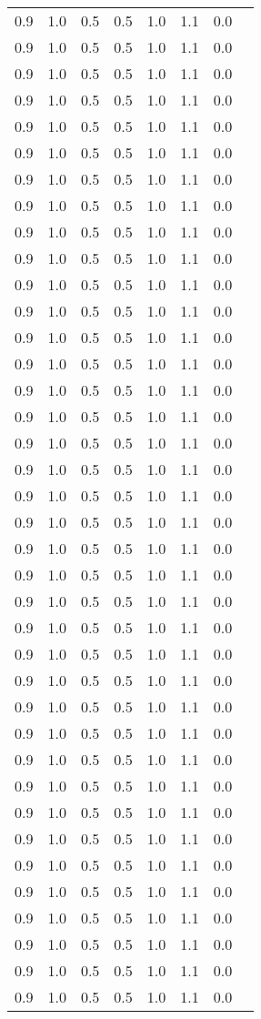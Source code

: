 \begin{tabular}{L{1in}|L{1in}|L{1in}|L{1in}|L{1in}|L{1in}|L{1in}|L{1in}}
0.9&1.0&0.5&0.5&1.0&1.1&0.0\\
0.9&1.0&0.5&0.5&1.0&1.1&0.0\\
0.9&1.0&0.5&0.5&1.0&1.1&0.0\\
0.9&1.0&0.5&0.5&1.0&1.1&0.0\\
0.9&1.0&0.5&0.5&1.0&1.1&0.0\\
0.9&1.0&0.5&0.5&1.0&1.1&0.0\\
0.9&1.0&0.5&0.5&1.0&1.1&0.0\\
0.9&1.0&0.5&0.5&1.0&1.1&0.0\\
0.9&1.0&0.5&0.5&1.0&1.1&0.0\\
0.9&1.0&0.5&0.5&1.0&1.1&0.0\\
0.9&1.0&0.5&0.5&1.0&1.1&0.0\\
0.9&1.0&0.5&0.5&1.0&1.1&0.0\\
0.9&1.0&0.5&0.5&1.0&1.1&0.0\\
0.9&1.0&0.5&0.5&1.0&1.1&0.0\\
0.9&1.0&0.5&0.5&1.0&1.1&0.0\\
0.9&1.0&0.5&0.5&1.0&1.1&0.0\\
0.9&1.0&0.5&0.5&1.0&1.1&0.0\\
0.9&1.0&0.5&0.5&1.0&1.1&0.0\\
0.9&1.0&0.5&0.5&1.0&1.1&0.0\\
0.9&1.0&0.5&0.5&1.0&1.1&0.0\\
0.9&1.0&0.5&0.5&1.0&1.1&0.0\\
0.9&1.0&0.5&0.5&1.0&1.1&0.0\\
0.9&1.0&0.5&0.5&1.0&1.1&0.0\\
0.9&1.0&0.5&0.5&1.0&1.1&0.0\\
0.9&1.0&0.5&0.5&1.0&1.1&0.0\\
0.9&1.0&0.5&0.5&1.0&1.1&0.0\\
0.9&1.0&0.5&0.5&1.0&1.1&0.0\\
0.9&1.0&0.5&0.5&1.0&1.1&0.0\\
0.9&1.0&0.5&0.5&1.0&1.1&0.0\\
0.9&1.0&0.5&0.5&1.0&1.1&0.0\\
0.9&1.0&0.5&0.5&1.0&1.1&0.0\\
0.9&1.0&0.5&0.5&1.0&1.1&0.0\\
0.9&1.0&0.5&0.5&1.0&1.1&0.0\\
0.9&1.0&0.5&0.5&1.0&1.1&0.0\\
0.9&1.0&0.5&0.5&1.0&1.1&0.0\\
0.9&1.0&0.5&0.5&1.0&1.1&0.0\\
0.9&1.0&0.5&0.5&1.0&1.1&0.0\\
0.9&1.0&0.5&0.5&1.0&1.1&0.0\\

\end{tabular}
